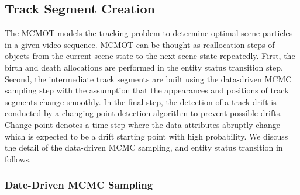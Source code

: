 \documentclass[runningheads]{llncs}
\begin{document}
\subsection{Track Segment Creation}

The MCMOT models the tracking problem to determine optimal scene particles in a given video sequence. MCMOT can be thought as reallocation steps of objects from the current scene state to the next scene state repeatedly. First, the birth and death allocations are performed in the entity status transition step. Second, the intermediate track segments are built using the data-driven MCMC sampling step with the assumption that the appearances and positions of track segments change smoothly. In the final step, the detection of a track drift is conducted by a changing point detection algorithm to prevent possible drifts. Change point denotes a time step where the data attributes abruptly change \cite{Ref24} which is expected to be a drift starting point with high probability. We discuss the detail of the data-driven MCMC sampling, and entity status transition in follows.

\subsubsection{Date-Driven MCMC Sampling}
\end{document}
